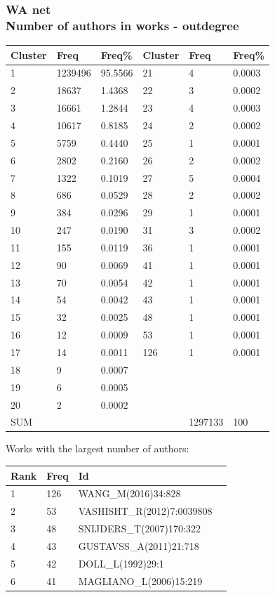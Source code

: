 \documentclass[hyperref={pdfstartview={FitBH -32768},
                         pdfpagemode=FullScreen,
                         plainpages=false,
                         colorlinks=true}
              ]{beamer}
\begin{document}
\begin{frame}[fragile]
\frametitle{WA net \label{numpap}\\ \normalsize Number of authors in works - outdegree}
\renewcommand{\arraystretch}{0.82}
\tiny
\begin{center}
\begin{tabular}{l|l|l||l|l|l}
Cluster&  	Freq&  	Freq\% &  	Cluster&   Freq &	Freq\%\\ \hline   
1&  	1239496&  	95.5566&  	21&  	4&  	0.0003\\
2&  	18637&  	1.4368&  	22&  	3&  	0.0002\\
3&  	16661&  	1.2844&  	23&  	4&  	0.0003\\
4&  	10617&  	0.8185&  	24&  	2&  	0.0002\\
5&  	5759&  	0.4440&  	25&  	1&  	0.0001\\
6&  	2802&  	0.2160&  	26&  	2&  	0.0002\\
7&  	1322&  	0.1019&  	27&  	5&  	0.0004\\
8&  	686&  	0.0529&  	28&  	2&  	0.0002\\
9&  	384&  	0.0296&  	29&  	1&  	0.0001\\
10&  	247&  	0.0190&  	31&  	3&  	0.0002\\
11&  	155&  	0.0119&  	36&  	1&  	0.0001\\
12&  	90&  	0.0069&  	41&  	1&  	0.0001\\
13&  	70&  	0.0054&  	42&  	1&  	0.0001\\
14&  	54&  	0.0042&  	43&  	1&  	0.0001\\
15&  	32&  	0.0025&  	48&  	1&  	0.0001\\
16&  	12&  	0.0009&  	53&  	1&  	0.0001\\
17&  	14&  	0.0011&  	126&  	1&  	0.0001\\
18&  	9&  	0.0007&  	  & 	 & 	\\
19&  	6&  	0.0005&  	 &	 &	\\
20&  	2&  	0.0002&  	&	 &	\\ 
SUM &     &              &       &  1297133 & 100  \\ \hline   
\end{tabular}
\end{center}
\medskip

\footnotesize

Works with the largest number of authors:
\medskip
\begin{center}
\renewcommand{\arraystretch}{0.82}
\tiny 
\begin{tabular}{l|l|l|l|}
     Rank    & Freq & Id \\ \hline
         1   & 126  & WANG\_M(2016)34:828 \\
         2    & 53   & VASHISHT\_R(2012)7:0039808 \\ 
         3      & 48  & SNIJDERS\_T(2007)170:322 \\ 
         4     & 43  & GUSTAVSS\_A(2011)21:718  \\ 
         5    & 42   & DOLL\_L(1992)29:1 \\ 
         6   &41 &  MAGLIANO\_L(2006)15:219 \\ \hline
\end{tabular}
\end{center}


\end{frame}
\end{document}
